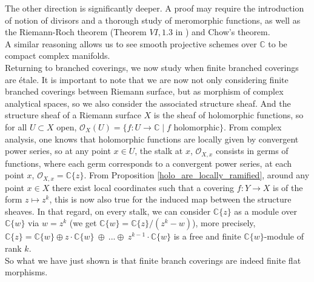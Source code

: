 \documentclass{article}
\theoremstyle{plain}
\theoremstyle{definition}
\begin{document}
\noindent The other direction is significantly deeper.
A proof may require the introduction of notion of divisors and a thorough study of meromorphic functions, as well as the Riemann-Roch theorem (Theorem $VI, 1.3$ in \cite{Hartshorne}) and Chow's theorem.\\
A similar reasoning allows us to see smooth projective schemes over $\mathbb{C}$ to be compact complex manifolds.\\


\noindent Returning to branched coverings, we now study when finite branched coverings are \'etale. 
It is important to note that we are now not only considering finite branched coverings between Riemann surface, but as morphism of complex analytical spaces, so we also consider the associated structure sheaf.
And the structure sheaf of a Riemann surface $X$ is the sheaf of holomorphic functions, so for all $U\subset X$ open, $\mathcal{O}_X(U)=\{f:U\rightarrow \mathbb{C}\mid f \text{ holomorphic}\}$.
From complex analysis, one knows that holomorphic functions are locally given by convergent power series, so at any point $x\in U$, the stalk at $x$, $\mathcal{O}_{X,x}$ consists in germs of functions, where each germ corresponds to a convergent power series, at each point $x$, $\mathcal{O}_{X,x} = \mathbb{C}\{z\}$. 
From Proposition \ref{holo_are_locally_ramified}, around any point $x\in X$ there exist local coordinates such that a covering $f:Y\rightarrow X$ is of the form $z\mapsto z^k$, this is now also true for the induced map between the structure sheaves. 
In that regard, on every stalk, we can consider 
$\mathbb{C}\{z\}$ as a module over $\mathbb{C}\{w\}$ via $w = z^k$ (we get $\mathbb{C}\{w\}=\mathbb{C}\{z\}/(z^k-w)$), more precisely, $\mathbb{C}\{z\} = \mathbb{C}\{w\}\oplus z\cdot\mathbb{C}\{w\}\:\oplus\:...\oplus \:z^{k-1}\cdot\mathbb{C}\{w\}$ is a free and finite $\mathbb{C}\{w\}$-module of rank $k$.\\
So what we have just shown is that finite branch coverings are indeed finite flat morphisms.\\
\end{document}
